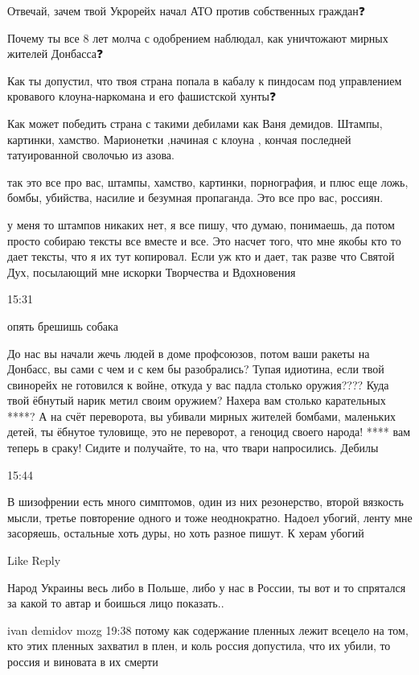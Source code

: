 
Отвечай, зачем твой Укрорейх начал АТО против собственных граждан❓

Почему ты все 8 лет молча с одобрением наблюдал, как уничтожают мирных жителей
Донбасса❓

Как ты допустил, что твоя страна попала в кабалу к пиндосам под управлением
кровавого клоуна-наркомана и его фашистской хунты❓

Как может победить страна с такими дебилами как Ваня демидов. Штампы, картинки,
хамство. Марионетки ,начиная с клоуна , кончая последней татуированной сволочью
из азова.

так это все про вас, штампы, хамство, картинки, порнография, и плюс еще ложь,
бомбы, убийства, насилие и безумная пропаганда. Это все про вас, россиян.

у меня то штампов никаких нет, я все пишу, что думаю, понимаешь, да потом
просто собираю тексты все вместе и все. Это насчет того, что мне якобы кто то
дает тексты, что я их тут копировал. Если уж кто и дает, так разве что Святой
Дух, посылающий мне искорки Творчества и Вдохновения

15:31

опять брешишь собака

До нас вы начали жечь людей в доме профсоюзов, потом ваши ракеты на Донбасс, вы
сами с чем и с кем бы разобрались? Тупая идиотина, если твой свинорейх не
готовился к войне, откуда у вас падла столько оружия???? Куда твой ёбнутый
нарик метил своим оружием? Нахера вам столько карательных ****? А на счёт
переворота, вы убивали мирных жителей бомбами, маленьких детей, ты ёбнутое
туловище, это не переворот, а геноцид своего народа! **** вам теперь в сраку!
Сидите и получайте, то на, что твари напросились. Дебилы

15:44

В шизофрении есть много симптомов, один из них резонерство, второй вязкость
мысли, третье повторение одного и тоже неоднократно. Надоел убогий, ленту мне
засоряешь, остальные хоть дуры, но хоть разное пишут. К херам убогий

    Like
    Reply


Народ Украины весь либо в Польше, либо у нас в России, ты вот и то спрятался за
какой то автар и боишься лицо показать..

ivan demidov mozg
19:38
потому как содержание пленных лежит всецело на том, кто этих пленных захватил в плен, и коль россия допустила, что их убили, то россия и виновата в их смерти

